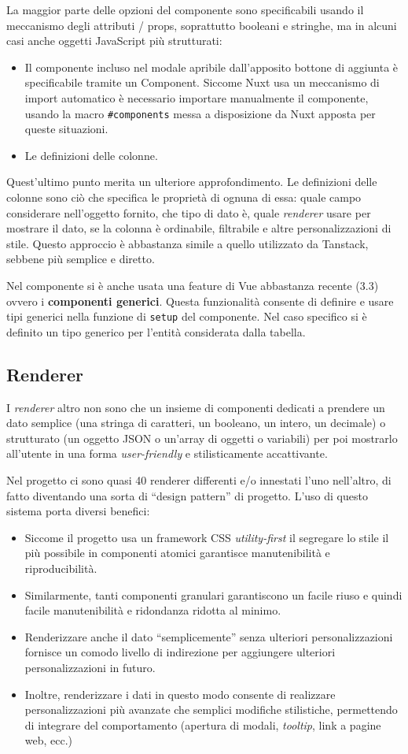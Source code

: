 La maggior parte delle opzioni del componente sono specificabili usando il meccanismo degli attributi / props, soprattutto booleani e stringhe, ma in alcuni casi anche oggetti JavaScript più strutturati:
\begin{itemize}
    \item Il componente incluso nel modale apribile dall'apposito bottone di aggiunta è specificabile tramite un Component. Siccome Nuxt usa un meccanismo di import automatico è necessario importare manualmente il componente, usando la macro \texttt{\#components} messa a disposizione da Nuxt apposta per queste situazioni.
    \item Le definizioni delle colonne.
\end{itemize}
Quest'ultimo punto merita un ulteriore approfondimento. Le definizioni delle colonne sono ciò che specifica le proprietà di ognuna di essa: quale campo considerare nell'oggetto fornito, che tipo di dato è, quale \emph{renderer} usare per mostrare il dato, se la colonna è ordinabile, filtrabile e altre personalizzazioni di stile. Questo approccio è abbastanza simile a quello utilizzato da Tanstack, sebbene più semplice e diretto.

Nel componente si è anche usata una feature di Vue abbastanza recente (3.3) ovvero i \textbf{componenti generici}. Questa funzionalità consente di definire e usare tipi generici nella funzione di \texttt{setup} del componente. Nel caso specifico si è definito un tipo generico per l'entità considerata dalla tabella.

\subsection{Renderer}
I \emph{renderer} altro non sono che un insieme di componenti dedicati a prendere un dato semplice (una stringa di caratteri, un booleano, un intero, un decimale) o strutturato (un oggetto JSON o un'array di oggetti o variabili) per poi mostrarlo all'utente in una forma \emph{user-friendly} e stilisticamente accattivante.

Nel progetto ci sono quasi 40 renderer differenti e/o innestati l'uno nell'altro, di fatto diventando una sorta di ``design pattern'' di progetto. L'uso di questo sistema porta diversi benefici:
\begin{itemize}
    \item Siccome il progetto usa un framework CSS \emph{utility-first} il segregare lo stile il più possibile in componenti atomici garantisce manutenibilità e riproducibilità.
    \item Similarmente, tanti componenti granulari garantiscono un facile riuso e quindi facile manutenibilità e ridondanza ridotta al minimo.
    \item Renderizzare anche il dato ``semplicemente'' senza ulteriori personalizzazioni fornisce un comodo livello di indirezione per aggiungere ulteriori personalizzazioni in futuro.
    \item Inoltre, renderizzare i dati in questo modo consente di realizzare personalizzazioni più avanzate che semplici modifiche stilistiche, permettendo di integrare del comportamento (apertura di modali, \emph{tooltip}, link a pagine web, ecc.)
\end{itemize}

